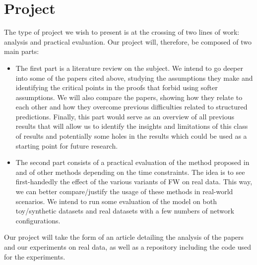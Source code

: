 \documentclass{article}
\begin{document}
\section*{Project}
The type of project we wish to present is at the crossing of two lines of work: analysis and practical evaluation. Our project will, therefore, be composed of two main parts:
\begin{itemize}
    \item The first part is a literature review on the subject. We intend to go deeper into some of the papers cited above, studying the assumptions they make  and identifying the critical points in the proofs that forbid using softer assumptions. We will also compare the papers, showing how they relate to each other and how they overcome previous difficulties related to structured predictions. Finally, this part would serve as an overview of all previous results that will allow us to identify the insights and limitations of this class of results and potentially some holes in the results which could be used as a starting point for future research.
    \item The second part consists of a practical evaluation of the method proposed in  and of other methods depending on the time constraints. The idea is to see first-handedly the effect of the various variants of FW on real data. This way, we can better compare/justify the usage of these methods in real-world scenarios. We intend to run some evaluation of the model on both toy/synthetic datasets and real datasets with a few numbers of network configurations. %
\end{itemize}


Our project will take the form of an article detailing the analysis of the papers and our experiments on real data, as well as a repository including the code used for the experiments. 



\end{document}
